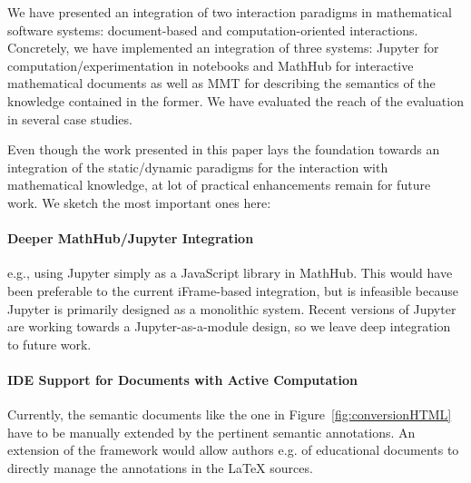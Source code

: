 
We have presented an integration of two interaction paradigms in mathematical software systems: document-based and computation-oriented interactions. Concretely, we have implemented an integration of three systems:
Jupyter for computation/experimentation in notebooks and MathHub for interactive mathematical documents as well as MMT for describing the semantics of the knowledge contained in the former.
We have evaluated the reach of the evaluation in several case studies.


Even though the work presented in this paper lays the  foundation towards an integration of the static/dynamic paradigms for the interaction with mathematical knowledge, at lot of practical enhancements remain for future work.
We sketch the most important ones here:

\paragraph{Deeper MathHub/Jupyter Integration} e.g., using Jupyter simply as a JavaScript library in MathHub.
This would have been preferable to the current iFrame-based integration, but is infeasible because Jupyter is primarily designed as a monolithic system.
Recent versions of Jupyter are working towards a Jupyter-as-a-module design, so we leave deep integration to future work.

\paragraph{IDE Support for Documents with Active Computation}
Currently, the semantic documents like the one in Figure~\ref{fig:conversionHTML} have to be manually extended by the pertinent semantic annotations. An extension of the \sTeX framework would allow authors e.g. of educational documents to directly manage the annotations in the {\LaTeX} sources. 

